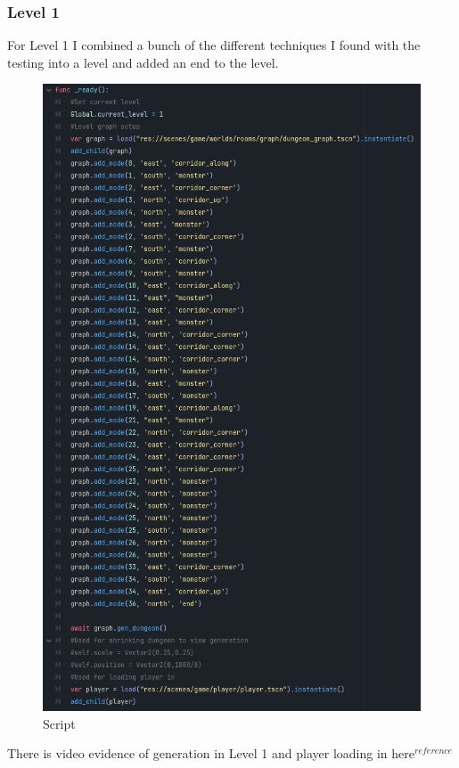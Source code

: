 \documentclass{article}
\begin{document}
        \subsubsection{Level 1}
        For Level 1 I combined a bunch of the different techniques I found with the testing into a level and added an end to the level.\\
        \begin{figure}[H]
                \centering
                \includegraphics[width = 0.8\columnwidth]{images/development/Level1_script.PNG}
                \caption{Script}
        \end{figure}
        There is video evidence of generation in Level 1 and player loading in here$^{reference}$

\newpage
\end{document}
